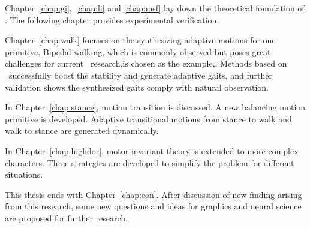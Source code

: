 Chapter~\ref{chap:gi},~\ref{chap:li} and \ref{chap:msf} lay down the theoretical foundation of {\moit}.
The following chapter provides experimental verification.



Chapter~\ref{chap:walk} focuses on the synthesizing adaptive motions for one primitive.
Bipedal walking,  which is commonly observed but poses great challenges for current \cms\ research,is chosen as the example,.
Methods based on {\moit}\ successfully boost the stability and generate adaptive gaits, and further validation shows the synthesized gaits comply with natural observation. 

In Chapter~\ref{chap:stance}, motion transition is discussed. 
A new balancing motion primitive is developed. 
Adaptive transitional motions from stance to walk and walk to stance are generated dynamically.


In Chapter~\ref{chap:highdor}, motor invariant theory is extended to more complex characters.
Three strategies are developed to simplify the problem for different situations.

This thesis ends with Chapter~\ref{chap:con}. 
After discussion of new finding arising from this research, some new questions and ideas for graphics and neural science are proposed for further research.








